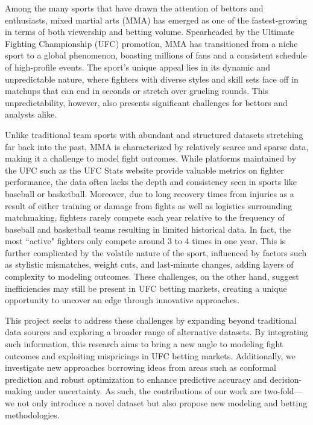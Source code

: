 \documentclass[12pt,twoside]{report}
\begin{document}
Among the many sports that have drawn the attention of bettors and enthusiasts, mixed martial arts (MMA) has emerged as one of the fastest-growing in terms of both viewership and betting volume. Spearheaded by the Ultimate Fighting Championship (UFC) promotion, MMA has transitioned from a niche sport to a global phenomenon, boasting millions of fans and a consistent schedule of high-profile events. The sport’s unique appeal lies in its dynamic and unpredictable nature, where fighters with diverse styles and skill sets face off in matchups that can end in seconds or stretch over grueling rounds. This unpredictability, however, also presents significant challenges for bettors and analysts alike.

Unlike traditional team sports with abundant and structured datasets stretching far back into the past, MMA is characterized by relatively scarce and sparse data, making it a challenge to model fight outcomes. While platforms maintained by the UFC such as the UFC Stats website provide valuable metrics on fighter performance, the data often lacks the depth and consistency seen in sports like baseball or basketball. Moreover, due to long recovery times from injuries as a result of either training or damage from fights as well as logistics surrounding matchmaking, fighters rarely compete each year relative to the frequency of baseball and basketball teams resulting in limited historical data. In fact, the most ``active" fighters only compete around 3 to 4 times in one year. This is further complicated by the volatile nature of the sport, influenced by factors such as stylistic mismatches, weight cuts, and last-minute changes, adding layers of complexity to modeling outcomes. These challenges, on the other hand, suggest inefficiencies may still be present in UFC betting markets, creating a unique opportunity to uncover an edge through innovative approaches.

This project seeks to address these challenges by expanding beyond traditional data sources and exploring a broader range of alternative datasets. By integrating such information, this research aims to bring a new angle to modeling fight outcomes and exploiting mispricings in UFC betting markets. Additionally, we investigate new approaches borrowing ideas from areas such as conformal prediction and robust optimization to enhance predictive accuracy and decision-making under uncertainty. As such, the contributions of our work are two-fold---we not only introduce a novel dataset but also propose new modeling and betting methodologies.
\end{document}
